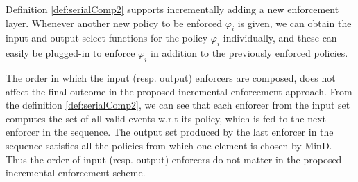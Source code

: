 \begin{remark}
	
	Definition \ref{def:serialComp2} supports incrementally adding a new enforcement layer. Whenever another new policy to be enforced $\varphi_i$ is given, we can obtain the input and output select functions for the policy $\varphi_i$ individually, and these can easily be plugged-in to enforce $\varphi_i$ in addition to the previously enforced policies. 
	
\end{remark}
%

\begin{remark}
	The order in which the input (resp. output) enforcers are composed, does not affect the final outcome in the proposed incremental enforcement approach. From the definition \ref{def:serialComp2}, we can see that each enforcer from the input set computes the set of all valid events w.r.t its policy, which is fed to the next enforcer in the sequence. The output set produced by the last enforcer in the sequence satisfies all the policies from which one element is chosen by MinD. Thus the order of input (resp. output) enforcers do not matter
	in the proposed incremental enforcement scheme.
\end{remark}

